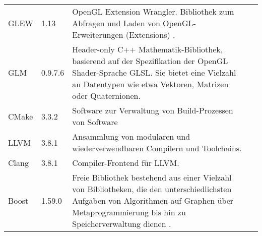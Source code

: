 \begin{longtabu}{p{0.2\textwidth}p{0.1\textwidth}p{0.6\textwidth}p{0.1\textwidth}}
    GLEW       & 1.13    & OpenGL Extension Wrangler. Bibliothek zum Abfragen
                           und Laden von OpenGL-Erweiterungen (Extensions)
                           \parencite{wikipedia_the_free_encyclopedia_opengl_2015-1}.
                           &\protect\footnotemark{}\\

    GLM        & 0.9.7.6 & Header-only C++ Mathematik-Bibliothek, basierend auf
                           der Spezifikation der OpenGL Shader-Sprache GLSL.
                           Sie bietet eine Vielzahl an Datentypen wie etwa
                           Vektoren, Matrizen oder Quaternionen.
                           &\protect\footnotemark{}\\

    CMake      & 3.3.2   & Software zur Verwaltung von Build-Prozessen von 
                           Software
                           &\protect\footnotemark{}\\

    LLVM       & 3.8.1   & Ansammlung von modularen und wiederverwendbaren
                           Compilern und Toolchains.
                           &\protect\footnotemark{}\\

    Clang      & 3.8.1   & Compiler-Frontend für LLVM.\@
                           &\protect\footnotemark{}\\

    Boost      & 1.59.0  & Freie Bibliothek bestehend aus einer Vielzahl von
                           Bibliotheken, die den unterschiedlichsten
                           Aufgaben von Algorithmen auf Graphen über 
                           Metaprogrammierung bis hin zu Speicherverwaltung
                           dienen
                           \parencite{wikipedia_the_free_encyclopedia_boost_2015}.
                           &\protect\footnotemark{}\\
    \bottomrule
\end{longtabu}
